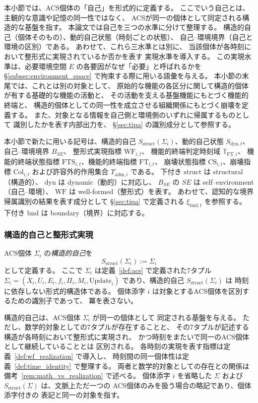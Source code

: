 本小節では、ACS個体の「自己」を形式的に定義する。
ここでいう自己とは、主観的な意識や記憶の同一性ではなく、
ACSが同一の個体として同定される構造的な基盤を指す。
本論文では自己を三つの水準に分けて整理する。
構造的自己（個体そのもの）、動的自己状態（時刻ごとの状態）、
自己--環境境界（自己と環境の区別）である。
あわせて、これら三水準とは別に、
当該個体が各時刻において整形式に実現されているか否かを表す
実現水準を導入する。
この実現水準は、必要環境空間 $E$ の各要因がなぜ「必要」と呼ばれるかを
\S\ref{subsec:environment_space} で拘束する際に用いる語彙を与える。
本小節の末尾では、これとは別の対象として、
原始的な機能の各区分に関して構造的個体が有する基礎的な機能の活動と、
その活動を支える基盤機能にもとづく機能的終端と、
構造的個体としての同一性を成立させる組織関係にもとづく崩壊を定義する。
また、対象となる情報を自己側と環境側のいずれに帰属するものとして
識別したかを表す内部出力を、
\S\ref{sec:tipa} の識別成分として参照する。

本小節で新たに用いる記号は、構造的自己
$S_{\mathrm{struct}}(\Sigma_i)$、動的自己状態
$S_{\mathrm{dyn},t}$、自己--環境境界 $B_{SE}$、
整形式実現指標 $\mathrm{WF}_{i,t}$、
機能的終端判定時刻域 $\mathbb{T}_{\mathrm{FT},i}$、
機能的終端状態指標 $\mathrm{FTS}_{i,t}$、機能的終端指標 $\mathrm{FT}_{i,t}$、
崩壊状態指標 $\mathrm{CS}_{i,t}$、崩壊指標 $\mathrm{Col}_{i,t}$
および許容外的作用集合 $\Upsilon_{\mathrm{adm},i}$ である。
下付き $\mathrm{struct}$ は structural（構造的）、
$\mathrm{dyn}$ は dynamic（動的）に対応し、
$B_{SE}$ の $SE$ は self--environment（自己--環境）、
$\mathrm{WF}$ は well-formed（整形式）を表す。
あわせて、認知的な境界帰属識別の結果を表す成分として
\S\ref{sec:tipa} で定義される $\xi_{\mathrm{bnd},t}$ を参照する。
下付き $\mathrm{bnd}$ は boundary（境界）に対応する。

\subsubsection{構造的自己と整形式実現}

\begin{definition}[構造的自己]
\label{def:s_struct}
ACS個体 $\Sigma_i$ の\emph{構造的自己}を
\[
  S_{\mathrm{struct}}(\Sigma_i) := \Sigma_i
\]
として定義する。
ここで $\Sigma_i$ は定義~\ref{def:acs} で定義された7タプル
$\Sigma_i = ( X_i , U_i, E_i, f_i, \Pi_i, M_i, \mathrm{Update}_i)$
であり、構造的自己 $S_{\mathrm{struct}}(\Sigma_i)$ は
時刻に依存しない形式的構造体である。
個体添字 $i$ は対象とするACS個体を区別するための識別子であって、
冪を表さない。

構造的自己は、ACS個体 $\Sigma_i$ が同一の個体として
同定される基盤を与える。
ただし、数学的対象としての7タプルが存在することと、
その7タプルが記述する構造が各時刻において整形式に実現され、
かつ時刻をまたいで同一のACS個体として継続していることとは
区別される。
各時刻の実現を表す指標は定義~\ref{def:wf_realization} で導入し、
時刻間の同一個体性は定義~\ref{def:time_identity} で整理する。
両者と数学的対象としての存在との関係は
備考~\ref{rem:math_vs_realization} で述べる。
個体添字 $i$ を省略した $\Sigma$ および
$S_{\mathrm{struct}}(\Sigma)$ は、文脈上ただ一つの
ACS個体のみを扱う場合の略記であり、個体添字付きの
表記と同一の対象を指す。
\end{definition}

